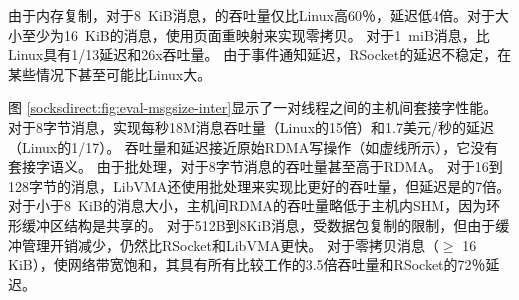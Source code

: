 由于内存复制，对于8~KiB消息，\sys 的吞吐量仅比Linux高60％，延迟低4倍。对于大小至少为16~KiB的消息，\sys 使用页面重映射来实现零拷贝。
对于1~miB消息，\sys 比Linux具有1/13延迟和26x吞吐量。
由于事件通知延迟，RSocket的延迟不稳定，在某些情况下甚至可能比Linux大。


图 \ref {socksdirect:fig:eval-msgsize-inter}显示了一对线程之间的主机间套接字性能。
对于8字节消息，\sys 实现每秒18M消息吞吐量（Linux的15倍）和1.7美元/秒的延迟（Linux的1/17）。
吞吐量和延迟接近原始RDMA写操作（如虚线所示），它没有套接字语义。
由于批处理，\sys  {}对于8字节消息的吞吐量甚至高于RDMA。
对于16到128字节的消息，LibVMA还使用批处理来实现比\sys  {}更好的吞吐量，但延迟是\sys  {}的7倍。
对于小于8~KiB的消息大小，主机间RDMA的吞吐量略低于主机内SHM，因为环形缓冲区结构是共享的。
对于512B到8KiB消息，\sys  {}受数据包复制的限制，但由于缓冲管理开销减少，仍然比RSocket和LibVMA更快。
对于零拷贝消息（$\ge$ 16 KiB），\sys  {}使网络带宽饱和，其具有所有比较工作的3.5倍吞吐量和RSocket的72％延迟。



